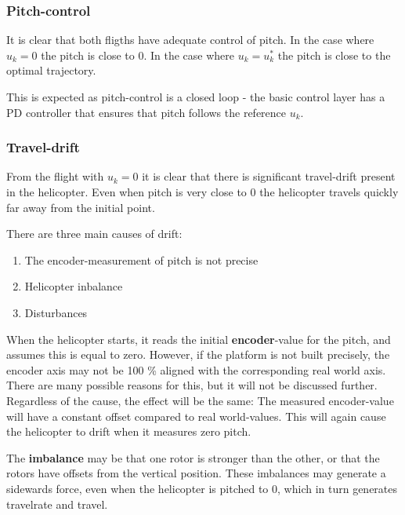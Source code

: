 \documentclass[../main.tex]{subfiles}
\begin{document}
\subsubsection{Pitch-control}
It is clear that both fligths have adequate control of pitch. In the case where $u_k = 0$ the pitch is close to $0$. In the case where $u_k = u_k^*$ the pitch is close to the optimal trajectory.

This is expected as pitch-control is a closed loop - the basic control layer has a PD controller that ensures that pitch follows the reference $u_k$.

\subsubsection{Travel-drift}\label{kap:LAB2_travel_drift_causes}
From the flight with $u_k = 0$ it is clear that there is significant travel-drift present in the helicopter. Even when pitch is very close to $0$ the helicopter travels quickly far away from the initial point.

There are three main causes of drift:
\begin{enumerate}
	\item The encoder-measurement of pitch is not precise
	\item Helicopter inbalance
	\item Disturbances
\end{enumerate}

When the helicopter starts, it reads the initial \textbf{encoder}-value for the pitch, and assumes this is equal to zero. However, if the platform is not built precisely, the encoder axis may not be 100 \% aligned with the corresponding real world axis. There are many possible reasons for this, but it will not be discussed further. Regardless of the cause, the effect will be the same: The measured encoder-value will have a constant offset compared to real world-values. This will again cause the helicopter to drift when it measures zero pitch.


The \textbf{imbalance} may be that one rotor is stronger than the other, or that the rotors have offsets from the vertical position. These imbalances may generate a sidewards force, even when the helicopter is pitched to $0$, which in turn generates travelrate and travel.
\end{document}
